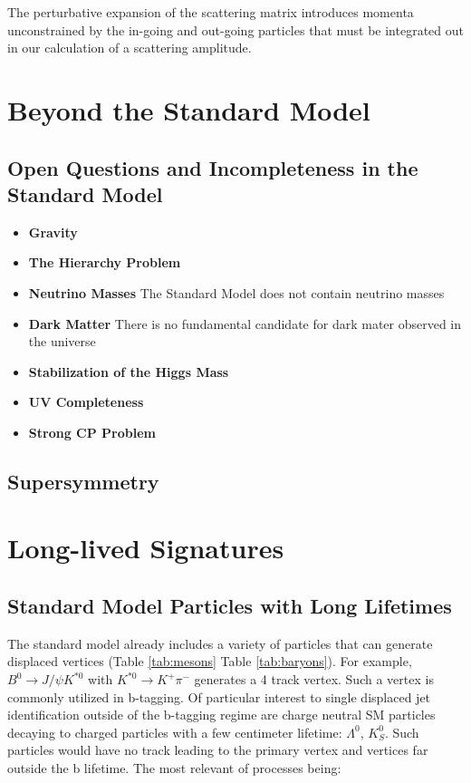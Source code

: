 The perturbative expansion of the scattering matrix introduces momenta unconstrained by the in-going and out-going particles that must be integrated out in our
calculation of a scattering amplitude.

\section{Beyond the Standard Model}

\subsection{Open Questions and Incompleteness in the Standard Model}

\begin{itemize}
\item \textbf{Gravity}
\item \textbf{The Hierarchy Problem}
\item \textbf{Neutrino Masses} The Standard Model does not contain neutrino masses 
\item \textbf{Dark Matter} There is no fundamental candidate for dark mater observed in the universe 
\item \textbf{Stabilization of the Higgs Mass} 
\item \textbf{UV Completeness} 
\item \textbf{Strong CP Problem}
\end{itemize}

\subsection{Supersymmetry}

\section{Long-lived Signatures}

\subsection{Standard Model Particles with Long Lifetimes}

The standard model already includes a variety of particles that can generate
 displaced vertices (Table \ref{tab:mesons} Table \ref{tab:baryons}). 
For example, $B^0 \rightarrow J/\psi K^{*0}$ with $K^{*0} \rightarrow K^+\pi^-$ 
generates a 4 track vertex. Such a vertex is commonly utilized 
in b-tagging. Of particular interest to single displaced jet identification outside of the b-tagging regime are charge neutral SM particles
decaying to charged particles with a few centimeter lifetime: $\Lambda^0$, $K_S^0$. Such particles would have no track
leading to the primary vertex and vertices far outside the b lifetime. The most relevant of processes being:

